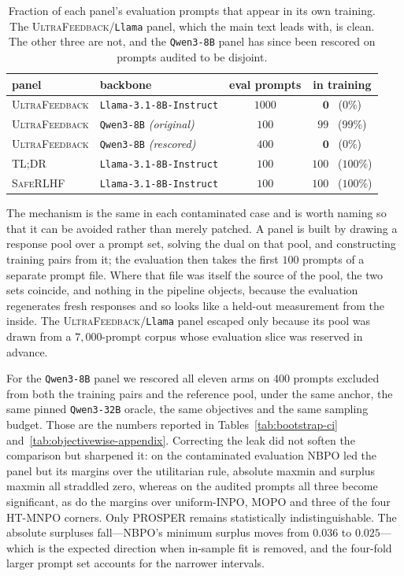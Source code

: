 \documentclass{article}
\theoremstyle{remark}
\theoremstyle{plain}
\newcommand{\NBPO}{\textsc{NBPO}}
\begin{document}
\begin{table}[htbp]
\centering\footnotesize
\setlength{\tabcolsep}{5.0pt}
\caption{Fraction of each panel's evaluation prompts that appear in its own training. The
\textsc{UltraFeedback}/\texttt{Llama} panel, which the main text leads with, is clean. The other three are
not, and the \texttt{Qwen3-8B} panel has since been rescored on prompts audited to be disjoint.}
\label{tab:overlap-audit}
\begin{tabular}{llcc}
\toprule
panel & backbone & eval prompts & in training\\
\midrule
\textsc{UltraFeedback} & \texttt{Llama-3.1-8B-Instruct} & $1000$ & $\mathbf{0}$ \ ($0\%$)\\
\textsc{UltraFeedback} & \texttt{Qwen3-8B} \emph{(original)} & $100$ & $99$ \ ($99\%$)\\
\textsc{UltraFeedback} & \texttt{Qwen3-8B} \emph{(rescored)} & $400$ & $\mathbf{0}$ \ ($0\%$)\\
\textsc{TL;DR} & \texttt{Llama-3.1-8B-Instruct} & $100$ & $100$ \ ($100\%$)\\
\textsc{SafeRLHF} & \texttt{Llama-3.1-8B-Instruct} & $100$ & $100$ \ ($100\%$)\\
\bottomrule
\end{tabular}
\end{table}

The mechanism is the same in each contaminated case and is worth naming so that it can be avoided rather
than merely patched. A panel is built by drawing a response pool over a prompt set, solving the dual on
that pool, and constructing training pairs from it; the evaluation then takes the first $100$ prompts of a
separate prompt file. Where that file was itself the source of the pool, the two sets coincide, and nothing
in the pipeline objects, because the evaluation regenerates fresh responses and so looks like a held-out
measurement from the inside. The \textsc{UltraFeedback}/\texttt{Llama} panel escaped only because its pool
was drawn from a $7{,}000$-prompt corpus whose evaluation slice was reserved in advance.

For the \texttt{Qwen3-8B} panel we rescored all eleven arms on $400$ prompts excluded from both the
training pairs and the reference pool, under the same anchor, the same pinned \texttt{Qwen3-32B} oracle,
the same objectives and the same sampling budget. Those are the numbers reported in
Tables~\ref{tab:bootstrap-ci} and~\ref{tab:objectivewise-appendix}. Correcting the leak did not soften the
comparison but sharpened it: on the contaminated evaluation \NBPO{} led the panel but its margins over the
utilitarian rule, absolute maxmin and surplus maxmin all straddled zero, whereas on the audited prompts all
three become significant, as do the margins over uniform-INPO, MOPO and three of the four HT-MNPO corners.
Only PROSPER remains statistically indistinguishable. The absolute surpluses fall---\NBPO{}'s minimum
surplus moves from $0.036$ to $0.025$---which is the expected direction when in-sample fit is removed, and
the four-fold larger prompt set accounts for the narrower intervals.
\end{document}
